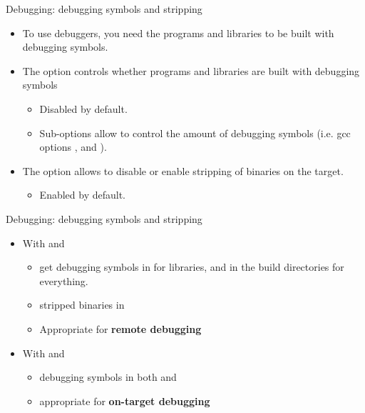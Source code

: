 \begin{frame}{Debugging: debugging symbols and stripping}
  \begin{itemize}
  \item To use debuggers, you need the programs and libraries to be
    built with debugging symbols.
  \item The  option controls whether programs
    and libraries are built with debugging symbols
    \begin{itemize}
    \item Disabled by default.
    \item Sub-options allow to control the amount of debugging symbols
      (i.e. gcc options ,  and ).
    \end{itemize}
  \item The  option
    allows to disable or enable stripping of binaries on the target.
    \begin{itemize}
    \item Enabled by default.
    \end{itemize}
  \end{itemize}
\end{frame}

\begin{frame}{Debugging: debugging symbols and stripping}
  \begin{itemize}
  \item With  and 
    \begin{itemize}
    \item get debugging symbols in  for
      libraries, and in the build directories for everything.
    \item stripped binaries in 
    \item Appropriate for {\bf remote debugging}
    \end{itemize}
  \item With  and 
    \begin{itemize}
    \item debugging symbols in both  and
    \item appropriate for {\bf on-target debugging}
    \end{itemize}
  \end{itemize}
\end{frame}

